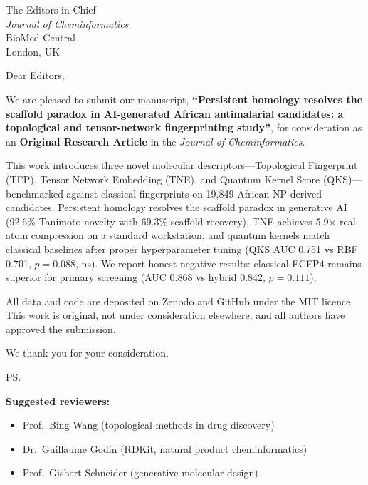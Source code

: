 \documentclass[11pt,a4paper]{letter}
\begin{document}
\begin{letter}{%
  The Editors-in-Chief \\
  \textit{Journal of Cheminformatics} \\
  BioMed Central \\
  London, UK
}

\opening{Dear Editors,}

We are pleased to submit our manuscript, \textbf{``Persistent homology resolves the scaffold paradox in AI-generated African antimalarial candidates: a topological and tensor-network fingerprinting study''}, for consideration as an \textbf{Original Research Article} in the \textit{Journal of Cheminformatics}.

This work introduces three novel molecular descriptors---Topological Fingerprint (TFP), Tensor Network Embedding (TNE), and Quantum Kernel Score (QKS)---benchmarked against classical fingerprints on 19,849 African NP-derived candidates. Persistent homology resolves the scaffold paradox in generative AI (92.6\% Tanimoto novelty with 69.3\% scaffold recovery), TNE achieves 5.9$\times$ real-atom compression on a standard workstation, and quantum kernels match classical baselines after proper hyperparameter tuning (QKS AUC 0.751 vs RBF 0.701, $p=0.088$, ns). We report honest negative results: classical ECFP4 remains superior for primary screening (AUC 0.868 vs hybrid 0.842, $p=0.111$).

All data and code are deposited on Zenodo and GitHub under the MIT licence. This work is original, not under consideration elsewhere, and all authors have approved the submission.

\closing{We thank you for your consideration.}

\ps{%
\textbf{Suggested reviewers:}\\
\begin{itemize}[leftmargin=*, itemsep=2pt]
  \item Prof.\ Bing Wang (topological methods in drug discovery)
  \item Dr.\ Guillaume Godin (RDKit, natural product cheminformatics)
  \item Prof.\ Gisbert Schneider (generative molecular design)
\end{itemize}
}

\end{letter}
\end{document}
